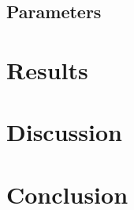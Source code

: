 \documentclass[a4paper,10pt]{article}
\begin{document}
\subsection{Parameters}

\section{Results}


\section{Discussion}



\section{Conclusion}



\medskip
\newpage


\end{document}
